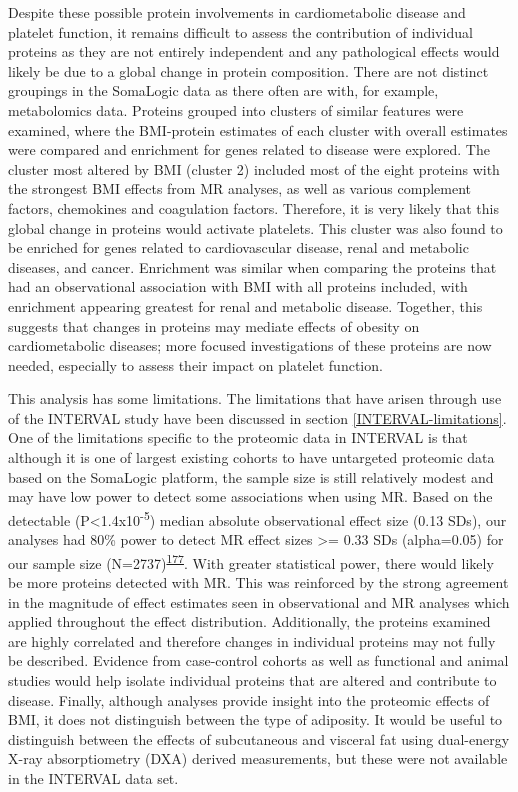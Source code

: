 \documentclass[11pt,twoside]{bristolthesis}
\begin{document}
Despite these possible protein involvements in cardiometabolic disease and platelet function, it remains difficult to assess the contribution of individual proteins as they are not entirely independent and any pathological effects would likely be due to a global change in protein composition. There are not distinct groupings in the SomaLogic data as there often are with, for example, metabolomics data. Proteins grouped into clusters of similar features were examined, where the BMI-protein estimates of each cluster with overall estimates were compared and enrichment for genes related to disease were explored. The cluster most altered by BMI (cluster 2) included most of the eight proteins with the strongest BMI effects from MR analyses, as well as various complement factors, chemokines and coagulation factors. Therefore, it is very likely that this global change in proteins would activate platelets. This cluster was also found to be enriched for genes related to cardiovascular disease, renal and metabolic diseases, and cancer. Enrichment was similar when comparing the proteins that had an observational association with BMI with all proteins included, with enrichment appearing greatest for renal and metabolic disease. Together, this suggests that changes in proteins may mediate effects of obesity on cardiometabolic diseases; more focused investigations of these proteins are now needed, especially to assess their impact on platelet function.

This analysis has some limitations. The limitations that have arisen through use of the INTERVAL study have been discussed in section \ref{INTERVAL-limitations}. One of the limitations specific to the proteomic data in INTERVAL is that although it is one of largest existing cohorts to have untargeted proteomic data based on the SomaLogic platform, the sample size is still relatively modest and may have low power to detect some associations when using MR. Based on the detectable (P\textless1.4x10\textsuperscript{-5}) median absolute observational effect size (0.13 SDs), our analyses had 80\% power to detect MR effect sizes \textgreater= 0.33 SDs (alpha=0.05) for our sample size (N=2737)\textsuperscript{\protect\hyperlink{ref-Brion2013}{177}}. With greater statistical power, there would likely be more proteins detected with MR. This was reinforced by the strong agreement in the magnitude of effect estimates seen in observational and MR analyses which applied throughout the effect distribution. Additionally, the proteins examined are highly correlated and therefore changes in individual proteins may not fully be described. Evidence from case-control cohorts as well as functional and animal studies would help isolate individual proteins that are altered and contribute to disease. Finally, although analyses provide insight into the proteomic effects of BMI, it does not distinguish between the type of adiposity. It would be useful to distinguish between the effects of subcutaneous and visceral fat using dual-energy X-ray absorptiometry (DXA) derived measurements, but these were not available in the INTERVAL data set.
\end{document}
